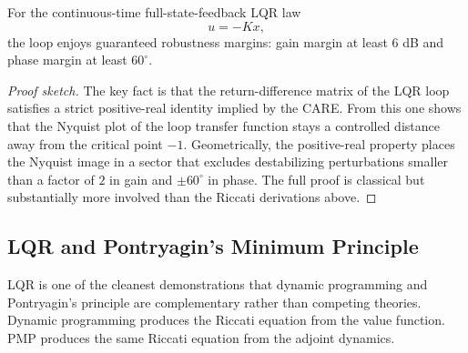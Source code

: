 \begin{theorem}\label{thm:l6-classical-robustness-margins-of-continuous-time-lqr}
	For the continuous-time full-state-feedback LQR law
	\[
		u=-Kx,
	\]
	the loop enjoys guaranteed robustness margins: gain margin at least $6$ dB and phase margin at least $60^\circ$.
\end{theorem}
\begin{proof}[Proof sketch]
	The key fact is that the return-difference matrix of the LQR loop satisfies a strict positive-real identity implied by the CARE. From this one shows that the Nyquist plot of the loop transfer function stays a controlled distance away from the critical point $-1$. Geometrically, the positive-real property places the Nyquist image in a sector that excludes destabilizing perturbations smaller than a factor of $2$ in gain and $\pm 60^\circ$ in phase. The full proof is classical but substantially more involved than the Riccati derivations above.
\end{proof}

\subsection{LQR and Pontryagin's Minimum Principle}
\label{sec:l6-lqr-and-pontryagin-s-minimum-principle}

\begin{remark}
	LQR is one of the cleanest demonstrations that dynamic programming and Pontryagin's principle are complementary rather than competing theories. Dynamic programming produces the Riccati equation from the value function. PMP produces the same Riccati equation from the adjoint dynamics.
\end{remark}

